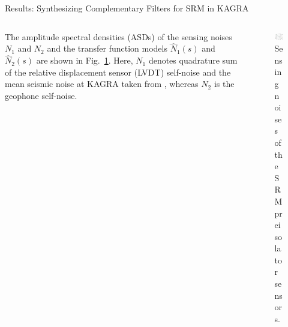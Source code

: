 \documentclass{beamer}
\begin{document}
\begin{frame}[t]
\begin{columns}[t]
\begin{column}{0.32\linewidth}
\begin{block}{Results: Synthesizing Complementary Filters for SRM in KAGRA}
\begin{columns}[t, onlytextwidth]
\begin{column}{0.55\textwidth}
						The amplitude spectral densities (ASDs) of the sensing noises $N_1$ and $N_2$ and the transfer function models $\hat{N}_1(s)$ and $\hat{N}_2(s)$ are shown in Fig.~\ref{fig:noise_fit}.
						Here, $N_1$ denotes quadrature sum of the relative displacement sensor (LVDT) self-noise and the mean seismic noise at KAGRA taken from \cite{seismic_noise_of_kagra}, whereas $N_2$ is the geophone self-noise.
					\end{column}
					\begin{column}{0.45\textwidth}
						\begin{figure}
							\centering
							\includegraphics[width=1\linewidth]{noise_fit}
							\caption{Sensing noises of the SRM preisolator sensors.}
							\label{fig:noise_fit}
						\end{figure}
					\end{column}
				\end{columns}
				

\end{block}
\end{column}
\end{columns}
\end{frame}
\end{document}
